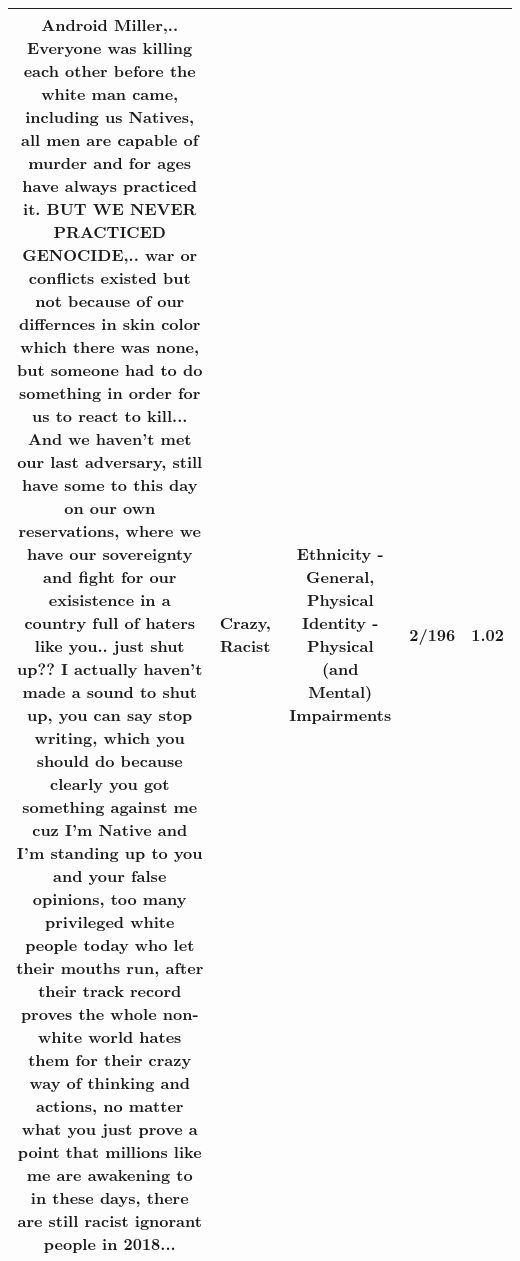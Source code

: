 \documentclass[11pt]{article}
\newlength\mylength
\begin{document}
\begin{center}
\begin{longtable}{|C{.65\mylength}|C{.30\mylength}|C{.12\mylength}|C{.12\mylength}|C{.12\mylength}|}
  \small Android Miller,.. Everyone was killing each other before the white man came, including us Natives, all men are capable of murder and for ages have always practiced it. BUT WE NEVER PRACTICED GENOCIDE,.. war or conflicts existed but not because of our differnces in skin color which there was none, but someone had to do something in order for us to react to kill... And we haven't met our last adversary, still have some to this day on our own reservations, where we have our sovereignty and fight for our exisistence in a country full of haters like you.. just shut up?? I actually haven't made a sound to shut up, you can say stop writing, which you should do because clearly you got something against me cuz I'm Native and I'm standing up to you and your false opinions, too many privileged white people today who let their mouths run, after their track record proves the whole non-white world hates them for their \textbf{crazy} way of thinking and actions, no matter what you just prove a point that millions like me are awakening to in these days, there are still \textbf{racist} ignorant people in 2018...\normalsize   & Crazy, Racist & Ethnicity - General, Physical Identity - Physical (and Mental) Impairments & 2/196 & 1.02 \\  \hline

\end{longtable}
\end{center}
\end{document}
